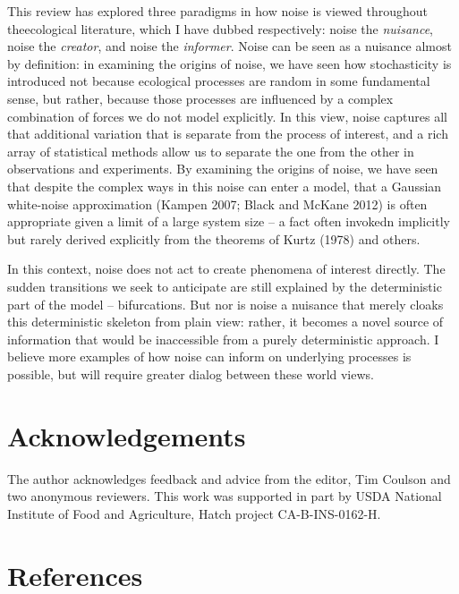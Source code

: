 \documentclass[3p]{elsarticle} %
\begin{document}
This review has explored three paradigms in how noise is viewed
throughout theecological literature, which I have dubbed respectively:
noise the \emph{nuisance}, noise the \emph{creator}, and noise the
\emph{informer}. Noise can be seen as a nuisance almost by definition:
in examining the origins of noise, we have seen how stochasticity is
introduced not because ecological processes are random in some
fundamental sense, but rather, because those processes are influenced by
a complex combination of forces we do not model explicitly. In this
view, noise captures all that additional variation that is separate from
the process of interest, and a rich array of statistical methods allow
us to separate the one from the other in observations and experiments.
By examining the origins of noise, we have seen that despite the complex
ways in this noise can enter a model, that a Gaussian white-noise
approximation (Kampen 2007; Black and McKane 2012) is often appropriate
given a limit of a large system size -- a fact often invokedn implicitly
but rarely derived explicitly from the theorems of Kurtz (1978) and
others.

In this context, noise does not act to create phenomena of interest
directly. The sudden transitions we seek to anticipate are still
explained by the deterministic part of the model -- bifurcations. But
nor is noise a nuisance that merely cloaks this deterministic skeleton
from plain view: rather, it becomes a novel source of information that
would be inaccessible from a purely deterministic approach. I believe
more examples of how noise can inform on underlying processes is
possible, but will require greater dialog between these world views.

\hypertarget{acknowledgements}{%
\section{Acknowledgements}\label{acknowledgements}}

The author acknowledges feedback and advice from the editor, Tim Coulson
and two anonymous reviewers. This work was supported in part by USDA
National Institute of Food and Agriculture, Hatch project
CA-B-INS-0162-H.

\hypertarget{references}{%
\section*{References}\label{references}}
\end{document}
